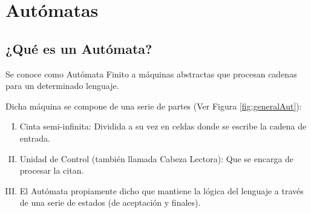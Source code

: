% 
% 
% 
% 
% 
% 
% 
% 
% 



\section{Autómatas}\label{sec:aut}

\subsection{¿Qué es un Autómata?}

 Se conoce como Autómata Finito a máquinas abstractas que procesan cadenas para un determinado lenguaje.

Dicha máquina se compone de una serie de partes (Ver Figura \ref{fig:generalAut}):

\begin{enumerate}[I.]

\item Cinta semi-infinita: Dividida a su vez en celdas donde se escribe la cadena de entrada.

\item {}Unidad de Control (también llamada Cabeza Lectora): Que se encarga de procesar la citan.

\item El Autómata propiamente dicho que mantiene la lógica del lenguaje a través de una serie de estados (de aceptación y finales).

\end{enumerate}

